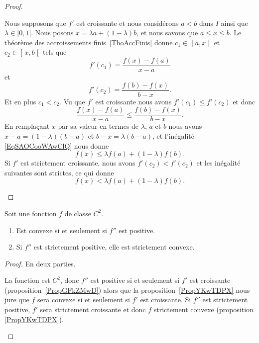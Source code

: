 \begin{proof}
\begin{subproof}
			Nous supposons que \( f'\) est croissante et nous considérons \( a<b\) dans \( I\) ainsi que \( \lambda\in \mathopen[ 0 , 1 \mathclose]\). Nous posons \( x=\lambda a+(1-\lambda)b\), et nous savons que \( a\leq x\leq b\). Le théorème des accroissements finis~\ref{ThoAccFinis} donne \( c_1\in\mathopen] a , x \mathclose[\) et \( c_2\in \mathopen] x , b \mathclose[\) tels que
		\begin{equation}
			f'(c_1)=\frac{ f(x)-f(a) }{ x-a }
		\end{equation}
		et
		\begin{equation}
			f'(c_2)=\frac{ f(b)-f(x) }{ b-x }.
		\end{equation}
		Et en plus \( c_1<c_2\). Vu que \( f'\) est croissante nous avons \( f'(c_1)\leq f'(c_2)\) et donc
		\begin{equation}       \label{EqSAOCooWAwClQ}
			\frac{ f(x)-f(a) }{ x-a }\leq\frac{ f(b)-f(x) }{ b-x }.
		\end{equation}
		En remplaçant \( x\) par sa valeur en termes de \( \lambda\), \( a\) et \( b\) nous avons \( x-a=(1-\lambda)(b-a)\) et \( b-x=\lambda(b-a)\), et l'inégalité \eqref{EqSAOCooWAwClQ} nous donne
		\begin{equation}
			f(x)\leq \lambda f(a)+(1-\lambda)f(b).
		\end{equation}
		Si \( f'\) est strictement croissante, nous avons \( f'(c_2)<f'(c_2)\) et les inégalité suivantes sont strictes, ce qui donne
		\begin{equation}
			f(x)< \lambda f(a)+(1-\lambda)f(b).
		\end{equation}
	\end{subproof}
\end{proof}

\begin{theorem} \label{ThoGXjKeYb}
	Soit une fonction \( f\) de classe \( C^2\).
	\begin{enumerate}
		\item       \label{ITEMooIUTQooTkRMoyBP}
		      Est convexe si et seulement si \( f''\) est positive.
		\item       \label{ITEMooXUOMooYIoOtv}
		      Si \( f''\) est strictement positive, elle est strictement convexe.
	\end{enumerate}
\end{theorem}

\begin{proof}
	En deux parties.
	\begin{subproof}
		La fonction est \( C^2\), donc \( f''\) est positive si et seulement si \( f'\) est croissante (proposition~\ref{PropGFkZMwD}) alors que la proposition~\ref{PropYKwTDPX} nous jure que \( f\) sera convexe si et seulement si \( f'\) est croissante.
		Si \( f''\) est strictement positive, \( f'\) sera strictement croissante et donc \( f\) strictement convexe (proposition \ref{PropYKwTDPX}).
	\end{subproof}
\end{proof}

